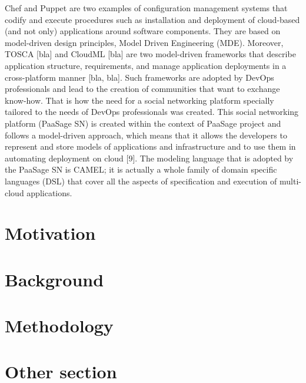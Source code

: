 Chef and Puppet are two examples of configuration management systems that codify and execute procedures such as installation and deployment of cloud-based (and not only) applications around software components. They are based on model-driven design principles, Model Driven Engineering (MDE). Moreover, TOSCA [bla] and CloudML [bla] are two model-driven frameworks that describe application structure, requirements, and manage application deployments in a cross-platform manner [bla, bla]. Such frameworks are adopted by DevOps professionals and lead to the creation of communities that want to exchange know-how. That is how the need for a social networking platform specially tailored to the needs of DevOps professionals was created. This social networking platform (PaaSage SN) is created within the context of PaaSage project and follows a model-driven approach, which means that it allows the developers to represent and store models of applications and infrastructure and to use them in automating deployment on cloud [9].
The modeling language that is adopted by the PaaSage SN is CAMEL; it is actually a whole family of domain specific languages (DSL) that cover all the aspects of specification and execution of multi-cloud applications. 

\section{Motivation}

\section{Background}

\section{Methodology}

\section{Other section}
